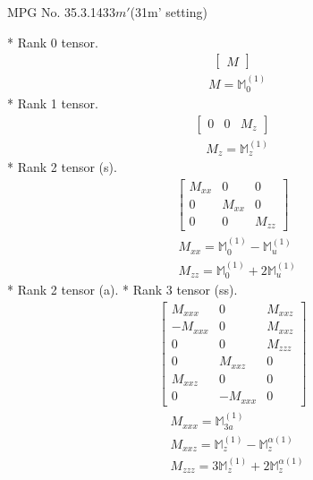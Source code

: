 \documentclass[fleqn,8pt,landscape]{jsarticle}
\begin{document}
\setcounter{MaxMatrixCols}{32}

\renewcommand{\tablename}{Table~}
\renewcommand{\figurename}{Figure~}
\begin{center}
\LARGE
MPG No. 35.3.143\quad$3m'$\quad(31m' setting)
\end{center}
* Rank 0 tensor.
\begin{align*}
\begin{bmatrix} M \end{bmatrix}
\end{align*}
\begin{align*}
& M = \mathbb{M}_{0}^{(1)}
\end{align*}
* Rank 1 tensor.
\begin{align*}
\begin{bmatrix} 0 & 0 & M_{z} \end{bmatrix}
\end{align*}
\begin{align*}
& M_{z} = \mathbb{M}_{z}^{(1)}
\end{align*}
* Rank 2 tensor (s).
\begin{align*}
\begin{bmatrix} M_{xx} & 0 & 0 \\ 0 & M_{xx} & 0 \\ 0 & 0 & M_{zz} \end{bmatrix}
\end{align*}
\begin{align*}
& M_{xx} = \mathbb{M}_{0}^{(1)} - \mathbb{M}_{u}^{(1)} \\
& M_{zz} = \mathbb{M}_{0}^{(1)} + 2 \mathbb{M}_{u}^{(1)}
\end{align*}
* Rank 2 tensor (a).
* Rank 3 tensor (ss).
\begin{align*}
\begin{bmatrix} M_{xxx} & 0 & M_{xxz} \\ - M_{xxx} & 0 & M_{xxz} \\ 0 & 0 & M_{zzz} \\ 0 & M_{xxz} & 0 \\ M_{xxz} & 0 & 0 \\ 0 & - M_{xxx} & 0 \end{bmatrix}
\end{align*}
\begin{align*}
& M_{xxx} = \mathbb{M}_{3a}^{(1)} \\
& M_{xxz} = \mathbb{M}_{z}^{(1)} - \mathbb{M}_{z}^{\alpha(1)} \\
& M_{zzz} = 3 \mathbb{M}_{z}^{(1)} + 2 \mathbb{M}_{z}^{\alpha(1)}
\end{align*}
\end{document}
